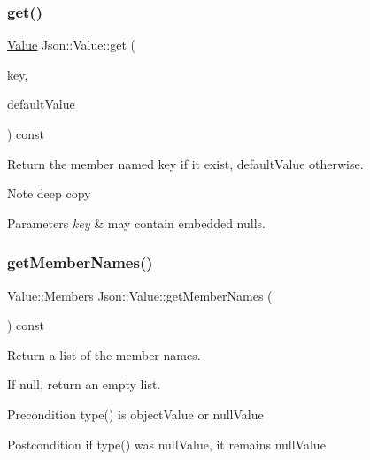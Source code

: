 \subsubsection{\texorpdfstring{get()}{get()}\hspace{0.1cm}{\footnotesize\ttfamily [4/4]}}
{\footnotesize\ttfamily \hyperlink{classJson_1_1Value}{Value} Json\+::\+Value\+::get (\begin{DoxyParamCaption}\item[{const J\+S\+O\+N\+C\+P\+P\+\_\+\+S\+T\+R\+I\+NG \&}]{key,  }\item[{const \hyperlink{classJson_1_1Value}{Value} \&}]{default\+Value }\end{DoxyParamCaption}) const}

Return the member named key if it exist, default\+Value otherwise. \begin{DoxyNote}{Note}
deep copy 
\end{DoxyNote}

\begin{DoxyParams}{Parameters}
{\em key} & may contain embedded nulls. \\
\hline
\end{DoxyParams}
\mbox{\label{classJson_1_1Value_a79d7725dce6260317333e69022367ac9}} 
\subsubsection{\texorpdfstring{get\+Member\+Names()}{getMemberNames()}}
{\footnotesize\ttfamily Value\+::\+Members Json\+::\+Value\+::get\+Member\+Names (\begin{DoxyParamCaption}{ }\end{DoxyParamCaption}) const}



Return a list of the member names. 

If null, return an empty list. \begin{DoxyPrecond}{Precondition}
type() is object\+Value or null\+Value 
\end{DoxyPrecond}
\begin{DoxyPostcond}{Postcondition}
if type() was null\+Value, it remains null\+Value 
\end{DoxyPostcond}
\mbox{\label{classJson_1_1Value_a2e1b7be6bde2fe23f15290d9ddbbdf8a}} 

